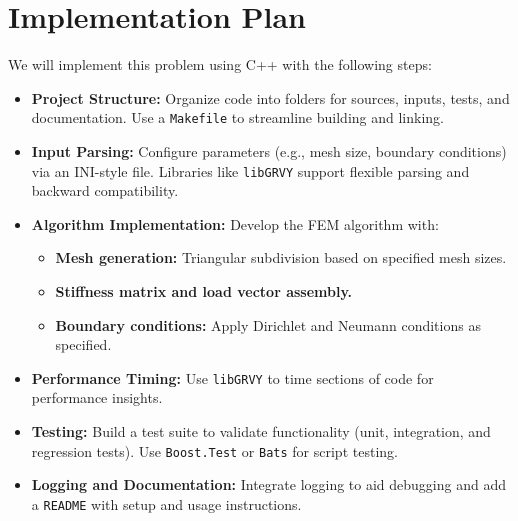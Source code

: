 \documentclass{article}
\begin{document}
\section{Implementation Plan}
We will implement this problem using C++ with the following steps:
\begin{itemize}
    \item \textbf{Project Structure:} Organize code into folders for sources, inputs, tests, and documentation. Use a \texttt{Makefile} to streamline building and linking.

    \item \textbf{Input Parsing:} Configure parameters (e.g., mesh size, boundary conditions) via an INI-style file. Libraries like \texttt{libGRVY} support flexible parsing and backward compatibility.

    \item \textbf{Algorithm Implementation:} Develop the FEM algorithm with:
    \begin{itemize}
        \item \textbf{Mesh generation:} Triangular subdivision based on specified mesh sizes.
        \item \textbf{Stiffness matrix and load vector assembly.}
        \item \textbf{Boundary conditions:} Apply Dirichlet and Neumann conditions as specified.
    \end{itemize}

    \item \textbf{Performance Timing:} Use \texttt{libGRVY} to time sections of code for performance insights.

    \item \textbf{Testing:} Build a test suite to validate functionality (unit, integration, and regression tests). Use \texttt{Boost.Test} or \texttt{Bats} for script testing.

    \item \textbf{Logging and Documentation:} Integrate logging to aid debugging and add a \texttt{README} with setup and usage instructions.
\end{itemize}
\end{document}
